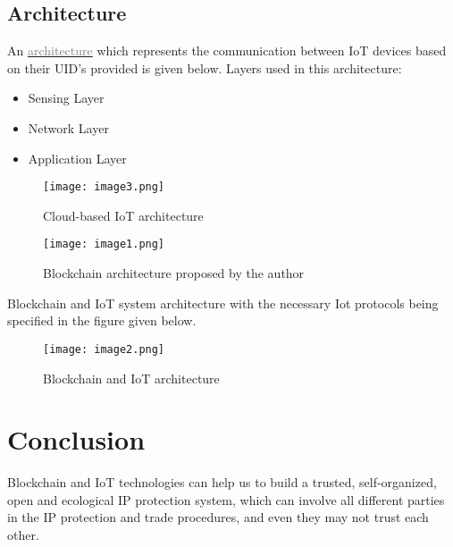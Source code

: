 \documentclass[a4paper]{article}
\begin{document}
\subsection{Architecture}
An  \href{https://www.researchgate.net/publication/317585066_Integration_of_Cloud_Computing_with_Internet_of_Things_Challenges_and_Open_Issues}{\textcolor{gray}{architecture}} which represents the communication between IoT devices based on their UID's provided
is given below. Layers used in this architecture:
\begin{itemize}
    \item Sensing Layer
    \item Network Layer
    \item Application Layer
\end{itemize}
\begin{figure}[H]
  \texttt{[image: image3.png]}
  \caption{Cloud-based IoT architecture}
  \label{fig:Blockchain and IoT system architecture}
\end{figure}

\begin{figure}[H]
  \texttt{[image: image1.png]}
  \caption{Blockchain architecture proposed by the author}
  \label{fig:Blockchain architecture proposed by the author}
\end{figure}
Blockchain and IoT system architecture with the necessary Iot protocols being specified in the figure given below.
\begin{figure}[H]
  \texttt{[image: image2.png]}
  \caption{Blockchain and IoT architecture }
  \label{fig:Blockchain and IoT system architecture}
\end{figure}


\section{Conclusion}
Blockchain and IoT technologies can help us to build a trusted, self-organized, open and ecological IP protection system, which can involve all different parties in the IP protection and trade procedures, and even they may not trust each other.
\end{document}
